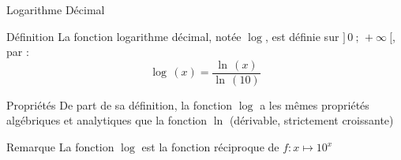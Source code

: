 \documentclass{cours}
\begin{document}
    \vspace{-2ex}
    \begin{Gpartie}{Logarithme Décimal} 
        \vspace{-2ex}
        \begin{Spartie}{Définition} 
            La fonction logarithme décimal, notée $\log$, est définie sur $\big]\,0~;\,+\infty~\big[$, par :
            \[\log\,(x)=\frac{\ln\,(x)}{\ln\,(10)}\]
        \end{Spartie}
        \vspace{-4ex}
        \begin{Spartie}{Propriétés} 
            De part de sa définition, la fonction $\log$ a les mêmes propriétés algébriques et analytiques que la fonction $\ln$ (dérivable, strictement croissante) 
        \end{Spartie}
        \begin{Spartie}{Remarque} 
            La fonction $\log$ est la fonction réciproque de $f:x\mapsto 10^x$
        \end{Spartie}
    \end{Gpartie}
\end{document}
